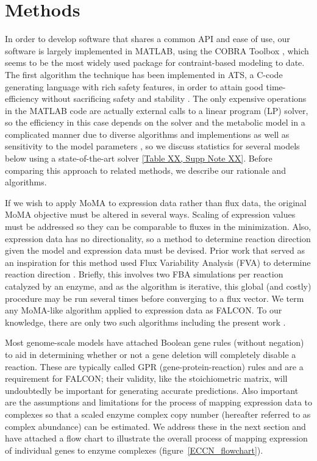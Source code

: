 \section{Methods}

In order to develop software that shares a common API and ease of use,
our software is largely implemented in MATLAB, using the COBRA
Toolbox \citep{Hyduke2011}, which seems to be the most widely used package for
contraint-based modeling to date. The first algorithm the technique
has been implemented in ATS, a C-code generating language with rich
safety features, in order to attain good time-efficiency without sacrificing
safety and stability \citep{ATStypes03}. The only expensive operations in the
MATLAB code are actually external calls to a linear program (LP) solver,
so the efficiency in this case depends on the solver and the metabolic
model in a complicated manner due to diverse algorithms and
implementions as well as sensitivity to the model parameters
\citep{Mittelmann2013,Todd2002}, so we discuss statistics for several
models below using a state-of-the-art solver \ref{Table XX, Supp Note
  XX}. Before comparing this approach to related methods, we describe
our rationale and algorithms.

If we wish to apply MoMA to expression data rather than flux data, the
original MoMA objective must be altered in several ways. Scaling of
expression values must be addressed so they can be comparable to
fluxes in the minimization. Also, expression data has no
directionality, so a method to determine reaction direction given the
model and expression data must be devised. Prior work that served as
an inspiration for this method used Flux Variability Analysis (FVA) to
determine reaction direction \citep{Lee2012}. Briefly, this involves
two FBA simulations per reaction catalyzed by an enzyme, and as the
algorithm is iterative, this global (and costly) procedure may be run
several times before converging to a flux vector. We term any
MoMA-like algorithm applied to expression data as FALCON. To our
knowledge, there are only two such algorithms including the present
work \citep{Lee2012}.

Most genome-scale models have attached Boolean gene rules (without
negation) to aid in determining whether or not a gene deletion will
completely disable a reaction. These are typically called GPR
(gene-protein-reaction) rules and are a requirement for FALCON; their
validity, like the stoichiometric matrix, will undoubtedly be
important for generating accurate predictions. Also important are the
assumptions and limitations for the process of mapping expression data
to complexes so that a scaled enzyme complex copy number (hereafter
referred to as complex abundance) can be estimated.  We address these
in the next section and have attached a flow chart to illustrate the
overall process of mapping expression of individual genes to enzyme
complexes (figure~\ref{ECCN_flowchart}).

